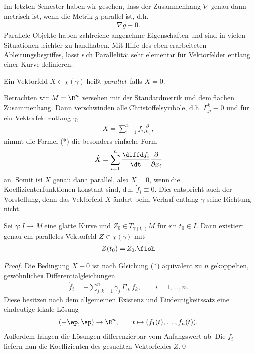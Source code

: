 \documentclass[%
	paper=a5,%
	fleqn,%
	DIV=18,%
	BCOR=0mm,
	fontsize=11pt,
	titlepage=false,%
	bibliography=totoc,
	DIV=18,%
	twoside=true,
	pdftitle=Riemannsche Geometrie,
	pdfauthor=Uwe Semmelmann,
	numbers=noendperiod]%
	{scrbook}
\begin{document}
Im letzten Semester haben wir gesehen, dass der Zusammenhang $\nabla$ genau dann
metrisch ist, wenn die Metrik $g$ parallel ist, d.h.
\begin{align*}
\nabla g \equiv 0.
\end{align*}
Parallele Objekte haben zahlreiche angenehme Eigenschaften und sind in vielen
Situationen leichter zu handhaben. Mit Hilfe des eben erarbeiteten
Ableitungsbegriffes, lässt sich Parallelität sehr elementar für Vektorfelder
entlang einer Kurve definieren.

\begin{defn}
Ein Vektorfeld $X\in\chi(\gamma)$ heißt \emph{parallel}, falls $\dot{X} =
0$.\fish
\end{defn}

\begin{ex}
Betrachten wir $M=\R^n$ versehen mit der Standardmetrik und dem flachen
Zusammenhang. Dann verschwinden alle Christoffelsymbole, d.h. $\Gamma_{ji}^k
\equiv 0$ und für ein Vektorfeld entlang $\gamma$,
\begin{align*}
X = \sum_{i=1}^n f_i \frac{\partial}{\partial x_i},
\end{align*}
nimmt die Formel (*) die besonders einfache Form
\begin{align*}
\dot{X} = \sum_{i=1}^n \frac{\diffd f_i}{\dt} \frac{\partial}{\partial x_i}
\end{align*}
an. Somit ist $X$ genau dann parallel, also $\dot{X}  =0$, wenn die
Koeffizientenfunktionen konstant sind, d.h. $\dot{f}_i \equiv 0$. Dies
entspricht auch der Vorstellung, denn das Vektorfeld $X$ ändert beim Verlauf
entlang $\gamma$ seine Richtung nicht.\bsp
\end{ex}

\begin{lem}
Sei $\gamma: I\to M$ eine glatte Kurve und $Z_0\in T_{\gamma(t_0)}M$ für ein
$t_0\in I$. Dann existiert genau ein paralleles Vektorfeld $Z\in\chi(\gamma)$
mit
\begin{align*}
Z(t_0) = Z_0.\fish 
\end{align*}
\end{lem}
\begin{proof}
Die Bedingung $\dot{X}\equiv 0$ ist nach Gleichung (*) äquivalent zu $n$
gekoppelten, gewöhnlichen Differentialgleichungen
\begin{align*}
\dot{f}_i = - \sum_{j,k=1}^n \dot{\gamma}_j\, \Gamma_{jk}^i\, f_k ,\qquad i =
1,\ldots,n.
\end{align*}
Diese besitzen nach dem allgemeinen Existenz und Eindeutigkeitssatz eine
eindeutige lokale Lösung
\begin{align*}
(-\ep,\ep)\to \R^n,\qquad t\mapsto (f_1(t),\ldots,f_n(t)).
\end{align*}
Außerdem hängen die Lösungen differenzierbar vom Anfangswert ab. Die $f_i$
liefern nun die Koeffizienten des gesuchten Vektorfeldes $Z$.\qed
\end{proof}
\end{document}
